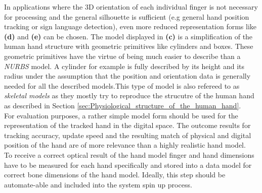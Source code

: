 In applications where the 3D orientation of each individual finger is not necessary for processing and the general silhouette is sufficient (e.g general hand position tracking or sign language detection), even more reduced representation forms like \textbf{(d)} and \textbf{(e)} can be chosen.
The model displayed in \textbf{(c)} is a simplification of the human hand structure with geometric primitives like cylinders and boxes. These geometric primitives have the virtue of being much easier to describe than a \textit{NURBS} model. A cylinder for example is fully described by its height and its radius under the assumption that the position and orientation data is generally needed for all the described models.This type of model is also refereed to as \textit{skeletal models} as they mostly try to reproduce the strucutre of the human hand as described in Section \ref{sec:Physiological_structure_of_the_human_hand}.\\
For evaluation purposes, a rather simple model form should be used for the representation of the tracked hand in the digital space. The outcome results for tracking accuracy, update speed and the resulting match of physical and digital position of the hand are of more relevance than a highly realistic hand model.
\\To receive a correct optical result of the hand model finger and hand dimensions have to be measured for each hand specifically and stored into a data model for correct bone dimensions of the hand model. Ideally, this step should be automate-able and included into the system spin up process.
 